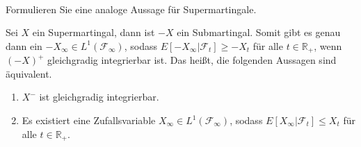 \documentclass{article}
\begin{document}
\paragraph{}
Formulieren Sie eine analoge Aussage für Supermartingale.

Sei $X$ ein Supermartingal, dann ist $-X$ ein Submartingal.
Somit gibt es genau dann ein $-X_\infty\in L^1(\mathscr{F}_\infty)$, sodass $E[-X_\infty|\mathscr{F}_t]\geq -X_t$ für alle $t\in\mathbb{R}_+$, wenn $(-X)^+$ gleichgradig integrierbar ist.
Das heißt, die folgenden Aussagen sind äquivalent.
\begin{enumerate}
\item $X^-$ ist gleichgradig integrierbar.
\item Es existiert eine Zufallsvariable $X_\infty\in L^1(\mathscr{F}_\infty)$, sodass $E[X_\infty|\mathscr{F}_t]\leq X_t$ für alle $t\in\mathbb{R}_+$.
\end{enumerate}


\end{document}
